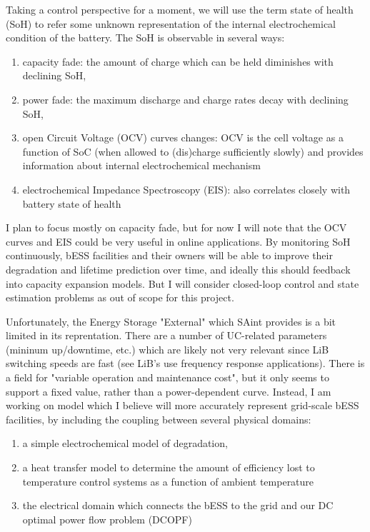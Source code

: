 \documentclass{homework}
\begin{document}
Taking a control perspective for a moment, we will use the term state of health (SoH) to refer some unknown representation of the internal electrochemical
condition of the battery. The SoH is observable in several ways:
\begin{enumerate}
    \item capacity fade: the amount of charge which can be held diminishes with declining SoH,
    \item power fade: the maximum discharge and charge rates decay with declining SoH,
    \item open Circuit Voltage (OCV) curves changes: OCV is the cell voltage as a function of SoC (when allowed to (dis)charge sufficiently slowly) and provides information about internal electrochemical mechanism
    \item electrochemical Impedance Spectroscopy (EIS): also correlates closely with battery state of health
\end{enumerate}

I plan to focus mostly on capacity fade, but for now I will note that the OCV curves and EIS could be very useful in online applications. By monitoring SoH continuously, bESS facilities and
their owners will be able to improve their degradation and lifetime prediction over time, and ideally this should feedback into capacity expansion models. But I will consider
closed-loop control and state estimation problems as out of scope for this project.

Unfortunately, the Energy Storage "External" which SAint provides is a bit limited in its reprentation. There are a number of UC-related parameters (mininum up/downtime, etc.) which 
are likely not very relevant since LiB switching speeds are fast (see LiB's use frequency response applications). There is a field for "variable operation and maintenance cost", but it only
seems to support a fixed value, rather than a power-dependent curve. Instead, I am working on model which I believe will more accurately represent grid-scale bESS facilities, by including
the coupling between several physical domains:
\begin{enumerate}
    \item a simple electrochemical model of degradation,
    \item a heat transfer model to determine the amount of efficiency lost to temperature control systems as a function of ambient temperature
    \item the electrical domain which connects the bESS to the grid and our DC optimal power flow problem (DCOPF)
\end{enumerate}
\end{document}
